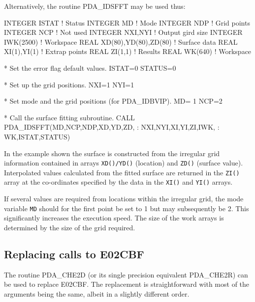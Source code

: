 \documentclass[11pt,twoside,nolof]{starlink}
\begin{document}
Alternatively, the routine PDA\_IDSFFT may be used thus:

\begin{terminalv}
      INTEGER  ISTAT                   ! Status
      INTEGER  MD                      ! Mode
      INTEGER  NDP                     ! Grid points
      INTEGER  NCP                     ! Not used
      INTEGER  NXI,NYI                 ! Output gird size
      INTEGER  IWK(2500)               ! Workspace
      REAL     XD(80),YD(80),ZD(80)    ! Surface data
      REAL     XI(1),YI(1)             ! Extrap points
      REAL     ZI(1,1)                 ! Results
      REAL     WK(640)                 ! Workspace

*   Set the error flag default values.
      ISTAT=0
      STATUS=0

*   Set up the grid positions.
      NXI=1
      NYI=1

*   Set mode and the grid positions (for PDA_IDBVIP).
      MD= 1
      NCP=2

*         Call the surface fitting subroutine.
            CALL PDA_IDSFFT(MD,NCP,NDP,XD,YD,ZD,
     :                      NXI,NYI,XI,YI,ZI,IWK,
     :                      WK,ISTAT,STATUS)
\end{terminalv}

In the example shown the surface is constructed from the irregular grid
information contained in arrays \texttt{XD()/YD()} (location) and
\texttt{ZD()} (surface value). Interpolated values calculated from the
fitted surface are returned in the \texttt{ZI()} array at the co-ordinates
specified by the data in the \texttt{XI()} and \texttt{YI()} arrays.

If several values are required from locations within the
irregular grid, the mode variable \texttt{MD} should for the first
point be set to 1 but may subsequently be 2. This
significantly increases the execution speed. The size of the work
arrays is determined by the size of the grid required.

\subsection{Replacing calls to E02CBF}
The routine PDA\_CHE2D (or its single precision equivalent PDA\_CHE2R)
can be used to replace E02CBF. The replacement is straightforward with most
of the arguments being the same, albeit in a slightly different order.

\end{document}
